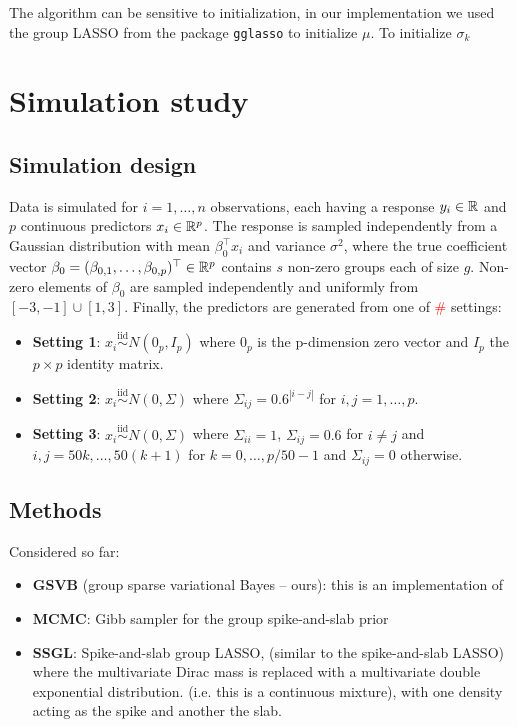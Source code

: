\documentclass[12pt]{article}
\renewcommand{\red}[1]{\textcolor{red}{#1}}
\begin{document}
The algorithm can be sensitive to initialization, in our implementation we used the group LASSO from the package \texttt{gglasso} to initialize $\mu$. To initialize $\sigma_k$ 






\newpage
\section{Simulation study}

\subsection{Simulation design}

Data is simulated for $i=1,\dots,n$ observations, each having a response $y_i \in \mathbb{R}$ and $p$ continuous predictors $x_i \in \mathbb{R}^p$. The response is sampled independently from a Gaussian distribution with mean $\beta_0^\top x_i$ and variance $\sigma^2$, where the true coefficient vector $\beta_0 = (\beta_{0, 1}, \dots, \beta_{0, p})^\top \in \mathbb{R}^p$ contains $s$ non-zero groups each of size $g$. Non-zero elements of $\beta_{0}$ are sampled independently and uniformly from $[-3,-1] \cup [1,3]$. Finally, the predictors are generated from one of \red{\#} settings:
\begin{itemize}
    \item \textbf{Setting 1}: $x_i \overset{\text{iid}}{\sim} N(0_p, I_p)$ where $0_p$ is the p-dimension zero vector and $I_p$ the $p\times p$ identity matrix.
    \item \textbf{Setting 2}: $x_i \overset{\text{iid}}{\sim} N(0, \Sigma)$ where $\Sigma_{ij} = 0.6^{|i - j|}$ for $i,j=1,\dots,p$.
    \item \textbf{Setting 3}: $x_i \overset{\text{iid}}{\sim} N(0, \Sigma)$  where $\Sigma_{ii} = 1$, $\Sigma_{ij}=0.6$ for $i\neq j$ and $i, j = 50k, \dots, 50(k+1)$ for $k=0,\dots, p/50 -1$ and $\Sigma_{ij} =0$ otherwise.
\end{itemize}

\subsection{Methods}

Considered so far:
\begin{itemize}
    \item \textbf{GSVB} (group sparse variational Bayes -- ours): this is an implementation of
    \item \textbf{MCMC}: Gibb sampler for the group spike-and-slab prior
    \item \textbf{SSGL}: Spike-and-slab group LASSO, (similar to the spike-and-slab LASSO) where the multivariate Dirac mass is replaced with a multivariate double exponential distribution. (i.e. this is a continuous mixture), with one density acting as the spike and another the slab.
\end{itemize}
\end{document}

